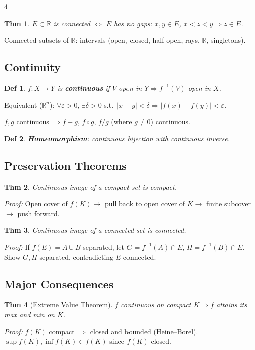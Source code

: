 \documentclass[9pt,landscape]{extarticle}
\newcommand{\R}{\mathbb{R}}
\newcommand{\eps}{\varepsilon}
\theoremstyle{compact}
\newtheorem*{thm}{Thm}
\newtheorem*{defn}{Def}
\begin{document}
\begin{multicols}{4}
\begin{thm}
$E \subset \R$ is connected $\Leftrightarrow$ $E$ has no gaps: $x,y \in E$, $x < z < y \Rightarrow z \in E$.
\end{thm}
Connected subsets of $\R$: intervals (open, closed, half-open, rays, $\R$, singletons).

\subsection{Continuity}
\begin{defn}
$f: X \to Y$ is \textbf{continuous} if $V$ open in $Y \Rightarrow f^{-1}(V)$ open in $X$.
\end{defn}

Equivalent ($\R^n$): $\forall \eps > 0$, $\exists \delta > 0$ s.t.\ $|x-y| < \delta \Rightarrow |f(x)-f(y)| < \eps$.

$f,g$ continuous $\Rightarrow f+g$, $f \circ g$, $f/g$ (where $g \neq 0$) continuous.

\begin{defn}
\textbf{Homeomorphism}: continuous bijection with continuous inverse.
\end{defn}

\subsection{Preservation Theorems}
\begin{thm}
Continuous image of a compact set is compact.
\end{thm}
\textit{Proof:} Open cover of $f(K) \to$ pull back to open cover of $K \to$ finite subcover $\to$ push forward.

\begin{thm}
Continuous image of a connected set is connected.
\end{thm}
\textit{Proof:} If $f(E) = A \cup B$ separated, let $G = f^{-1}(A) \cap E$, $H = f^{-1}(B) \cap E$. Show $G, H$ separated, contradicting $E$ connected.

\subsection{Major Consequences}

\begin{thm}[Extreme Value Theorem]
$f$ continuous on compact $K \Rightarrow f$ attains its max and min on $K$.
\end{thm}
\textit{Proof:} $f(K)$ compact $\Rightarrow$ closed and bounded (Heine--Borel). $\sup f(K), \inf f(K) \in f(K)$ since $f(K)$ closed.


\end{multicols}
\end{document}
